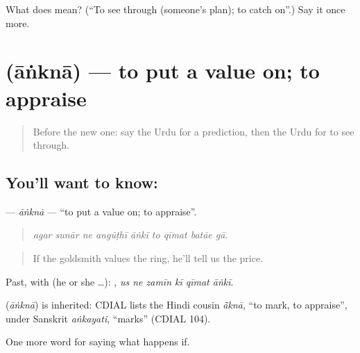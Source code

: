 \begin{tcolorbox}[breakable,colback=teal!4,colframe=teal!35!black,title={Before you move on}]
What does  mean? (\textquotedblleft{}To see through (someone's plan); to catch on\textquotedblright{}.) Say it once more.
\end{tcolorbox}
\section[\texorpdfstring{\ur{آنکنا} (āṅknā)}{آنکنا (āṅknā)}]{ (āṅknā) — to put a value on; to appraise}

\label{lesson:UR-C543-ankna}



\begin{quote}
Before the new one: say the Urdu for a prediction, then the Urdu for to see through.
\end{quote}

\subsection*{You'll want to know: }
\textbf{} — \emph{āṅknā} — \textquotedblleft{}to put a value on; to appraise\textquotedblright{}.

\begin{quote}
        
\end{quote}

\begin{quote}
\emph{agar sunār ne angūṭhī āṅkī to qīmat batāe gā.}
\end{quote}

\begin{quote}
If the goldsmith values the ring, he'll tell us the price.
\end{quote}

Past, with  (he or she …):      , \emph{us ne zamīn kī qīmat āṅkī}.

\begin{cousinweb}
\textbf{} (\emph{āṅknā}) is inherited: CDIAL lists the Hindi cousin \emph{ã̄knā}, \textquotedblleft{}to mark, to appraise\textquotedblright{}, under Sanskrit \emph{aṅkayati}, \textquotedblleft{}marks\textquotedblright{} (CDIAL 104).
\end{cousinweb}

\begin{grammarlens}[title={What you've built}]
One more word for saying what happens if.
\end{grammarlens}

